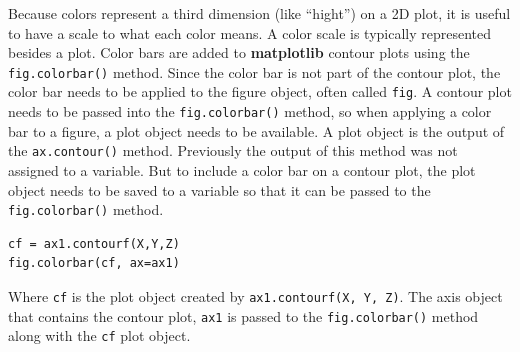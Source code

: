 \documentclass{book}
\begin{document}
    Because colors represent a third dimension (like ``hight'') on a 2D
plot, it is useful to have a scale to what each color means. A color
scale is typically represented besides a plot. Color bars are added to
\textbf{matplotlib} contour plots using the \lstinline!fig.colorbar()!
method. Since the color bar is not part of the contour plot, the color
bar needs to be applied to the figure object, often called
\lstinline!fig!. A contour plot needs to be passed into the
\lstinline!fig.colorbar()! method, so when applying a color bar to a
figure, a plot object needs to be available. A plot object is the output
of the \lstinline!ax.contour()! method. Previously the output of this
method was not assigned to a variable. But to include a color bar on a
contour plot, the plot object needs to be saved to a variable so that it
can be passed to the \lstinline!fig.colorbar()! method.

\begin{lstlisting}
cf = ax1.contourf(X,Y,Z)
fig.colorbar(cf, ax=ax1)
\end{lstlisting}

Where \lstinline!cf! is the plot object created by
\lstinline!ax1.contourf(X, Y, Z)!. The axis object that contains the
contour plot, \lstinline!ax1! is passed to the
\lstinline!fig.colorbar()! method along with the \lstinline!cf! plot
object.
\end{document}
